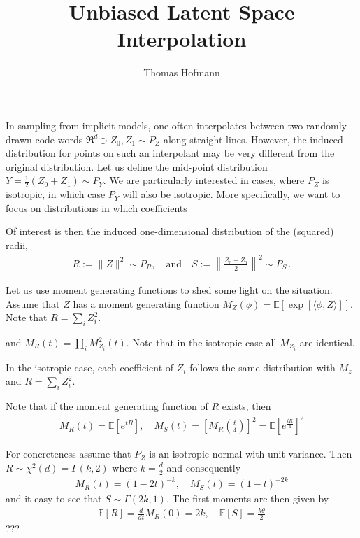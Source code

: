 \documentclass{article}
\author{Thomas Hofmann}
\title{Unbiased Latent Space Interpolation}
\newcommand{\expect}[1]{{\mathbb E}\left[{#1}\right]}
\begin{document}
\maketitle

In sampling from implicit models, one often interpolates between two randomly drawn code words $\Re^d \ni Z_0, Z_1 \sim P_Z$ along straight lines. However, the induced distribution for points on such an interpolant may be very different from the original distribution. Let us define the mid-point distribution $Y = \frac 12 ( Z_0 + Z_1) \sim P_Y$. We are particularly interested in cases, where $P_Z$ is isotropic, in which case $P_Y$ will also be isotropic. More specifically, we want to focus on distributions in which coefficients

 Of interest is then the induced one-dimensional distribution of the (squared) radii,
\begin{align}
R := \| Z\|^2 \sim P_R, \quad  \text{and}  \quad S :=  \left\|  \frac{Z_0 + Z_1}{2} \right\|^2 \sim P_S \,.
\end{align}


Let us use moment generating functions to shed some light on the situation. Assume that $Z$ has a moment generating function $M_Z(\phi) = \expect{\exp[\langle \phi, Z \rangle]}$. Note that $R=\sum_i Z_i^2$.

\newpage

 and $M_R(t) = \prod_i M^2_{Z_i}(t)$. Note that in the isotropic case all $M_{Z_i}$ are identical. 

\newpage




In the isotropic case, each coefficient of $Z_i$ follows the same distribution with $M_{z}$ and $R = \sum_i Z_i^2$.


\newpage


Note that if the moment generating function of $R$ exists, then 
\begin{align}
M_R(t) = \expect{e^{tR}}, \quad 
M_S(t) = \left[ M_R(\tfrac t4)  \right]^2 
= \expect{e^{\tfrac {tR}4 }}^2 
\end{align}

For concreteness assume that $P_Z$ is an isotropic normal with unit variance. Then $R \sim \chi^2(d)= \Gamma(k,2)$ where $k = \tfrac d2$ and consequently
\begin{align}
M_R(t) = (1-2t)^{-k} , \quad M_S(t) = \left(1- t \right)^{-2k}
\end{align} 
and it easy to see that $S \sim \Gamma(2k,1)$. The first moments are then given by 
\begin{align}
\expect{R} = \frac{d}{dt} M_R(0)  = 2k, \quad \expect{S} = \frac{k \theta }{2}
\end{align}
???
\end{document}
